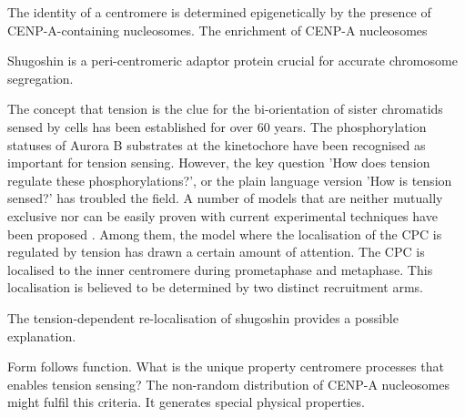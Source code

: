 The identity of a centromere is determined epigenetically by the presence of CENP-A-containing nucleosomes. The enrichment of CENP-A nucleosomes 

Shugoshin is a peri-centromeric adaptor protein crucial for accurate chromosome segregation.  

The concept that tension is the clue for the bi-orientation of sister chromatids sensed by cells has been established for over 60 years. The phosphorylation statuses of Aurora B substrates at the kinetochore have been recognised as important for tension sensing. However, the key question 'How does tension regulate these phosphorylations?', or the plain language version 'How is tension sensed?' has troubled the field. 
A number of models that are neither mutually exclusive nor can be easily proven with current experimental techniques have been proposed \citep{McVey2021AuroraSegregation}. Among them, the model where the localisation of the CPC is regulated by tension has drawn a certain amount of attention. The CPC is localised to the inner centromere during prometaphase and metaphase. This localisation is believed to be determined by two distinct recruitment arms. 

The tension-dependent re-localisation of shugoshin provides a possible explanation. 

Form follows function. What is the unique property centromere processes that enables tension sensing? The non-random distribution of CENP-A nucleosomes might fulfil this criteria. It generates special physical properties. 




